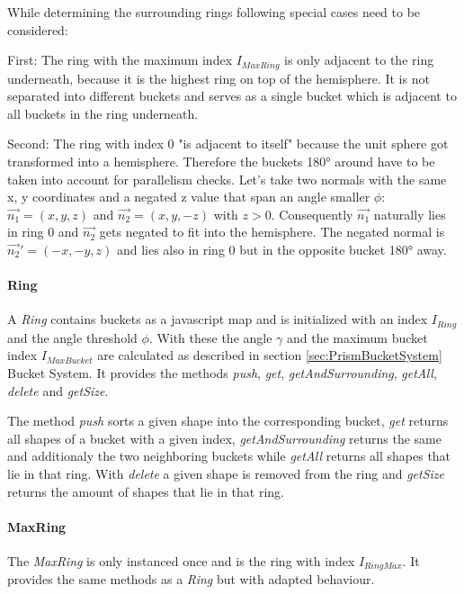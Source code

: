 \documentclass[../ClassicThesis.tex]{subfiles}
\begin{document}
While determining the surrounding rings following special cases need to be considered:

First: The ring with the maximum index $I_{MaxRing}$ is only adjacent to the ring underneath, because it is the highest ring on top of the hemisphere. It is not separated into different buckets and serves as a single bucket which is adjacent to all buckets in the ring underneath.

Second: The ring with index 0 "is adjacent to itself" because the unit sphere got transformed into a hemisphere. Therefore the buckets 180° around have to be taken into account for parallelism checks. Let's take two normals with the same x, y coordinates and a negated z value that span an angle smaller $ \phi $: $\vec{n_{1}} = (x, y, z)$ and $\vec{n_{2}} = (x, y, -z)$ with $z > 0$. Consequently $\vec{n_{1}}$ naturally lies in ring 0 and $\vec{n_{2}}$ gets negated to fit into the hemisphere. The negated normal is $\vec{n_{2}}' = (-x, -y, z) $ and lies also in ring 0 but in the opposite bucket 180° away.


\paragraph{Ring}

A \emph{Ring} contains buckets as a javascript map and is initialized with an index $ I_{Ring} $ and the angle threshold $ \phi$. With these the angle $ \gamma $ and the maximum bucket index $ I_{MaxBucket} $ are calculated as described in section \ref{sec:PrismBucketSystem} Bucket System. It provides the methods \emph{push}, \emph{get}, \emph{getAndSurrounding}, \emph{getAll}, \emph{delete} and \emph{getSize}.

The method \emph{push} sorts a given shape into the corresponding bucket, \emph{get} returns all shapes of a bucket with a given index, \emph{getAndSurrounding} returns the same and additionaly the two neighboring buckets while \emph{getAll} returns all shapes that lie in that ring. With \emph{delete} a given shape is removed from the ring and \emph{getSize} returns the amount of shapes that lie in that ring.


\paragraph{MaxRing} The \emph{MaxRing} is only instanced once and is the ring with index $ I_{RingMax} $. It provides the same methods as a \emph{Ring} but with adapted behaviour.
\end{document}
